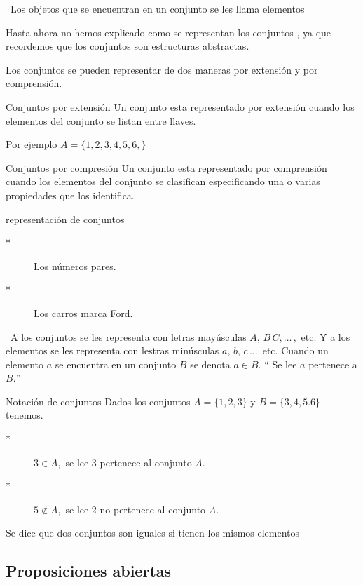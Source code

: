 \nota\ Los objetos que se encuentran en un conjunto se les llama
elementos

Hasta ahora no hemos explicado como se representan los conjuntos ,
ya que recordemos que los conjuntos son estructuras abstractas.

Los conjuntos se pueden representar de dos maneras por extensión y
por comprensión.

\begin{ideas}{ Conjuntos por extensión} Un conjunto esta representado
por extensión cuando los elementos del conjunto se listan entre llaves.\end{ideas}

Por ejemplo $A=\{1,2,3,4,5,6,\}$

\begin{ideas}{ Conjuntos por compresión} Un conjunto esta representado
por comprensión cuando los elementos del conjunto se clasifican especificando
una o varias propiedades que los identifica.\end{ideas}

\begin{ejem}{representación de conjuntos} 
\begin{description}
\item [{{*}}] Los números pares.
\item [{{*}}] Los carros marca Ford.
\end{description}
\end{ejem}

\notacion\ A los conjuntos se les representa con letras mayúsculas
$A,\, B\, C,\dots\,,$ etc. Y a los elementos se les representa con
lestras minúsculas $a,\, b,\, c\,\dots\,$ etc. Cuando un elemento
$a$ se encuentra en un conjunto $B$ se denota $a\in B.$ `` Se
lee $a$ pertenece a $B.$'' 

\begin{ejem}{Notación de conjuntos} Dados los conjuntos $A=\{1,2,3\}$
y $B=\{3,4,5.6\}$ tenemos.
\begin{description}
\item [{{*}}] $3\in A,$ se lee 3 pertenece al conjunto $A.$
\item [{{*}}] $5\notin A,$ se lee 2 no pertenece al conjunto $A.$
\end{description}
\end{ejem}

\nota Se dice que dos conjuntos son iguales si tienen los mismos
elementos


\subsection{Proposiciones abiertas}


